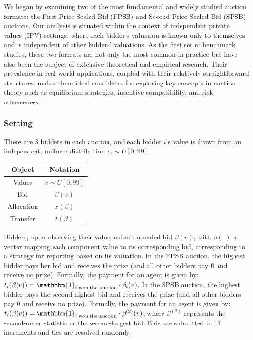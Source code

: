 \documentclass{article} %
\begin{document}
We began by examining two of the most fundamental and widely studied auction formats: the First-Price Sealed-Bid (FPSB) and Second-Price Sealed-Bid (SPSB) auctions. 
Our analysis is situated within the context of independent private values (IPV) settings, where each bidder's valuation is known only to themselves and is independent of other bidders' valuations.
As the first set of benchmark studies, these two formats are not only the most common in practice but have also been the subject of extensive theoretical and empirical research. 
Their prevalence in real-world applications, coupled with their relatively straightforward structures, makes them ideal candidates for exploring key concepts in auction theory such as equilibrium strategies, incentive compatibility, and risk-adverseness.


\subsubsection{Setting}
There are $3$ bidders in each auction, and each bidder $i$'s value is drawn from an independent, uniform distribution $v_i \sim U[0, 99]$. 
\begin{table}[h]
    \centering
    \begin{tabular}{|c|c|}
        \hline
        Object & Notation \\
        \hline
        Values & $v \sim U[0,99]$ \\
        \hline
        Bid & $\beta(v)$ \\
        \hline
        Allocation & $x(\beta)$ \\
        \hline
        Transfer & $t(\beta)$ \\
        \hline
    \end{tabular}
    \label{tab:notation}
\end{table}


Bidders, upon observing their value, submit a sealed bid $\beta(v)$, with $\beta(\cdot)$ a vector mapping each component value to its corresponding bid, corresponding to a strategy for reporting based on its valuation. 
In the FPSB auction, the highest bidder pays her bid and receives the prize (and all other bidders pay $0$ and receive no prize). Formally, the payment for an agent is given by: $t_i(\beta(v)) = \mathbbm{1}_{i \; \text{won the auction}}\cdot \beta_i(v)$. 
In the SPSB auction, the highest bidder pays the second-highest bid and receives the prize (and all other bidders pay $0$ and receive no prize). 
Formally, the payment for an agent is given by: $t_i(\beta(v)) = \mathbbm{1}_{i \; \text{won the auction}} \cdot \beta^{(2)}(v)$, where $\beta^{(2)}$ represents the second-order statistic or the second-largest bid. 
Bids are submitted in $\$1$ increments and ties are resolved randomly. 
\end{document}
